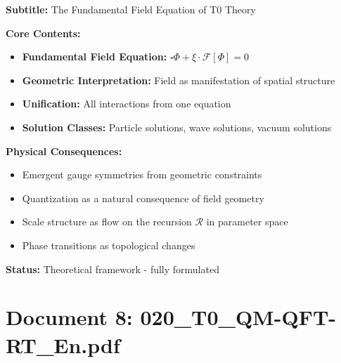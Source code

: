 	\begin{documentbox}
		\textbf{Subtitle:} The Fundamental Field Equation of T0 Theory
		
		\textbf{Core Contents:}
		\begin{itemize}
			\item \textbf{Fundamental Field Equation:} $\square \Phi + \xi \cdot \mathcal{F}[\Phi] = 0$
			\item \textbf{Geometric Interpretation:} Field as manifestation of spatial structure
			\item \textbf{Unification:} All interactions from one equation
			\item \textbf{Solution Classes:} Particle solutions, wave solutions, vacuum solutions
		\end{itemize}
		
		\textbf{Physical Consequences:}
		\begin{itemize}
			\item Emergent gauge symmetries from geometric constraints
			\item Quantization as a natural consequence of field geometry
			\item Scale structure as flow on the recursion $\mathcal{R}$ in parameter space
			\item Phase transitions as topological changes
		\end{itemize}
		
		\textbf{Status:} Theoretical framework - fully formulated
	\end{documentbox}
	
	\section{Document 8: 020\_T0\_QM-QFT-RT\_En.pdf}
	
